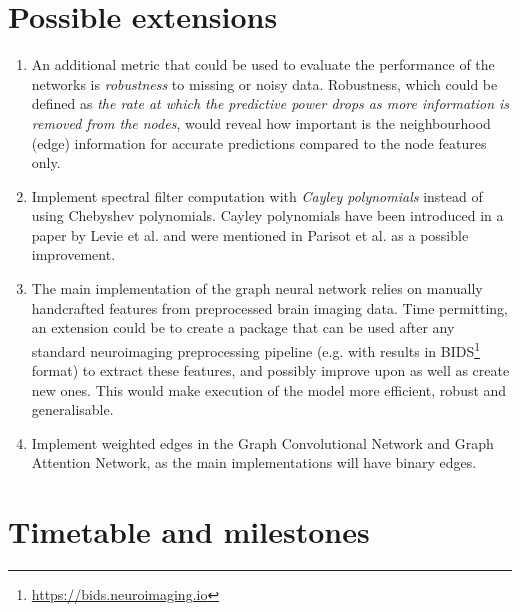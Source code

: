 \documentclass[12pt,a4paper,twoside, hidelinks]{article}
\begin{document}
\section*{Possible extensions}
\begin{enumerate}[label=PE\arabic*.]
  \item An additional metric that could be used to evaluate the performance of the networks is \textit{robustness} to missing or noisy data. Robustness, which could be defined as \textit{the rate at which the predictive power drops as more information is removed from the nodes}, would reveal how important is the neighbourhood (edge) information for accurate predictions compared to the node features only.
  \item Implement spectral filter computation with \textit{Cayley polynomials} instead of using Chebyshev polynomials. Cayley polynomials have been introduced in a paper by Levie et al. \cite{levie2017cayleynets} and were mentioned in Parisot et al. \cite{parisot2018disease} as a possible improvement.
  \item The main implementation of the graph neural network relies on manually handcrafted features from preprocessed brain imaging data. Time permitting, an extension could be to create a package that can be used after any standard neuroimaging preprocessing pipeline (e.g. with results in BIDS\footnote{\url{https://bids.neuroimaging.io}} format) to extract these features, and possibly improve upon as well as create new ones. This would make execution of the model more efficient, robust and generalisable.
  \item Implement weighted edges in the Graph Convolutional Network and Graph Attention Network, as the main implementations will have binary edges.

\end{enumerate}


\section*{Timetable and milestones}
\label{section:timetable}
\end{document}
